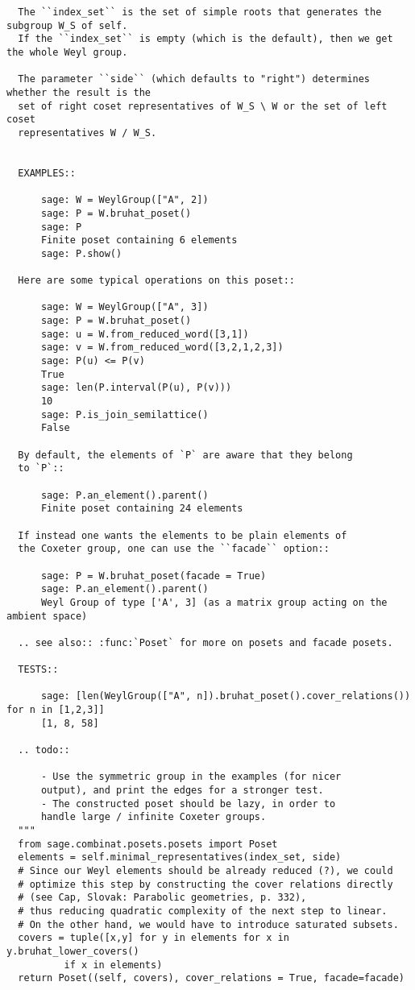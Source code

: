 \begin{appendices}
\begin{verbatim}
  The ``index_set`` is the set of simple roots that generates the subgroup W_S of self. 
  If the ``index_set`` is empty (which is the default), then we get the whole Weyl group.
  
  The parameter ``side`` (which defaults to "right") determines whether the result is the 
  set of right coset representatives of W_S \ W or the set of left coset 
  representatives W / W_S.
  
  
  EXAMPLES::

      sage: W = WeylGroup(["A", 2])
      sage: P = W.bruhat_poset()
      sage: P
      Finite poset containing 6 elements
      sage: P.show()

  Here are some typical operations on this poset::

      sage: W = WeylGroup(["A", 3])
      sage: P = W.bruhat_poset()
      sage: u = W.from_reduced_word([3,1])
      sage: v = W.from_reduced_word([3,2,1,2,3])
      sage: P(u) <= P(v)
      True
      sage: len(P.interval(P(u), P(v)))
      10
      sage: P.is_join_semilattice()
      False

  By default, the elements of `P` are aware that they belong
  to `P`::

      sage: P.an_element().parent()
      Finite poset containing 24 elements

  If instead one wants the elements to be plain elements of
  the Coxeter group, one can use the ``facade`` option::

      sage: P = W.bruhat_poset(facade = True)
      sage: P.an_element().parent()
      Weyl Group of type ['A', 3] (as a matrix group acting on the ambient space)

  .. see also:: :func:`Poset` for more on posets and facade posets.

  TESTS::

      sage: [len(WeylGroup(["A", n]).bruhat_poset().cover_relations()) for n in [1,2,3]]
      [1, 8, 58]

  .. todo::

      - Use the symmetric group in the examples (for nicer
	  output), and print the edges for a stronger test.
      - The constructed poset should be lazy, in order to
	  handle large / infinite Coxeter groups.
  """
  from sage.combinat.posets.posets import Poset
  elements = self.minimal_representatives(index_set, side)
  # Since our Weyl elements should be already reduced (?), we could 
  # optimize this step by constructing the cover relations directly
  # (see Cap, Slovak: Parabolic geometries, p. 332), 
  # thus reducing quadratic complexity of the next step to linear. 
  # On the other hand, we would have to introduce saturated subsets.
  covers = tuple([x,y] for y in elements for x in  y.bruhat_lower_covers() 
		  if x in elements)
  return Poset((self, covers), cover_relations = True, facade=facade)
        

\end{verbatim}
\end{appendices}
